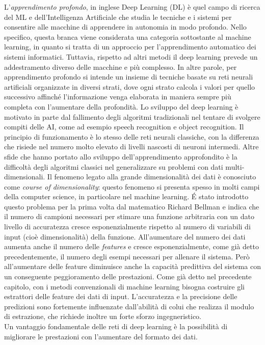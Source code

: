 L'\emph{apprendimento profondo}, in inglese Deep Learning (DL) è quel campo di ricerca del ML 
e dell'Intelligenza Artificiale che studia le tecniche e i sistemi per consentire alle macchine 
di apprendere in autonomia in modo profondo. Nello specifico, questa branca viene considerata una
 categoria sottostante al machine learning, in quanto si tratta di un approccio per l’apprendimento
  automatico dei sistemi informatici. Tuttavia, rispetto ad altri metodi il deep learning prevede 
  un addestramento diverso delle macchine e più complesso. In altre parole, per apprendimento profondo
   si intende un insieme
   di tecniche basate su reti neurali artificiali organizzate in diversi strati, dove ogni strato calcola
    i valori per quello successivo affinché l'informazione venga elaborata in maniera sempre più completa
     con l’aumentare della profondità. Lo sviluppo del deep learning è motivato in parte dal fallimento
      degli algoritmi
      tradizionali nel tentare di svolgere compiti delle AI, come ad esempio speech recognition e object recognition. 
      Il principio di funzionamento è lo stesso delle reti neurali classiche, con la differenza
       che risiede nel numero molto elevato di livelli nascosti di neuroni intermedi.
       Altre sfide che hanno portato allo sviluppo dell’apprendimento approfondito è la difficoltà
       degli algoritmi classici nel generalizzare su problemi con dati multi-dimensionali.
       Il fenomeno legato alla grande dimensionalità dei dati è conosciuto come \emph{course of 
       dimensionality}: questo fenomeno si presenta spesso in molti campi della computer science,
        in particolare nel machine learning. É stato introdotto questo problema per la prima volta
         dal matematico Richard Bellman e indica che il numero di campioni necessari per
          stimare una funzione arbitraria con un dato livello di accuratezza
           cresce esponenzialmente rispetto al numero di variabili di input
            (cioè dimensionalità) della funzione.
       All’aumentare del numero dei dati aumenta anche il numero delle \emph{features} e cresce 
       esponenzialmente, come già detto precedentemente, il numero degli esempi necessari per allenare
       il sistema. Però all’aumentare delle feature diminuisce anche la capacità predittiva del
       sistema con un conseguente peggioramento delle prestazioni.
       Come già detto nel precedente capitolo, con i metodi convenzionali di machine learning
       bisogna costruire gli estrattori delle feature dei dati di input. L’accuratezza e la precisione
       delle predizioni sono fortemente influenzate dall’abilità di colui che realizza il modulo di
       estrazione, che richiede inoltre un forte sforzo ingegneristico.\\
       Un vantaggio fondamentale delle reti di deep learning è la possibilità di migliorare le prestazioni 
       con l’aumentare del formato dei dati.

